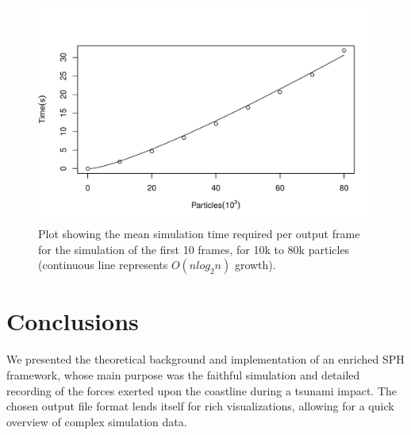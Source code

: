 \documentclass{llncs}
\begin{document}
\begin{figure}
  \includegraphics[width=\textwidth]{figures/performance.pdf}
  \caption{Plot showing the mean simulation time required per output frame for the
    simulation of the first 10 frames, for 10k to 80k particles (continuous line
    represents $O(n log_2n)$ growth).}
  \label{fig:performance}
\end{figure}

\section{Conclusions}
We presented the theoretical background and implementation of an enriched SPH framework,
whose main purpose was the faithful simulation and detailed recording of the forces
exerted upon the coastline during a tsunami impact. The chosen output file format lends
itself for rich visualizations, allowing for a quick overview of complex simulation data.
\end{document}
